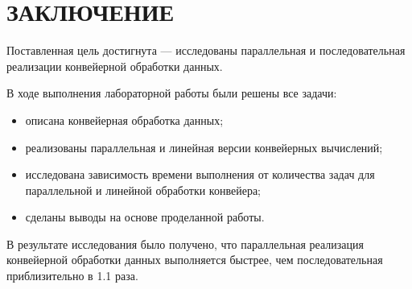 \chapter*{\hfill{\centering ЗАКЛЮЧЕНИЕ}\hfill}

Поставленная цель достигнута --- исследованы параллельная и последовательная реализации конвейерной обработки данных.

В ходе выполнения лабораторной работы были решены все задачи:
\begin{itemize}
	\item описана конвейерная обработка данных;
	\item реализованы параллельная и линейная версии конвейерных вычислений;
	\item исследована зависимость времени выполнения от количества задач для параллельной и линейной обработки конвейера;
	\item сделаны выводы на основе проделанной работы.
\end{itemize}

В результате исследования было получено, что параллельная реализация конвейерной обработки данных выполняется быстрее,
чем последовательная приблизительно в 1.1 раза.